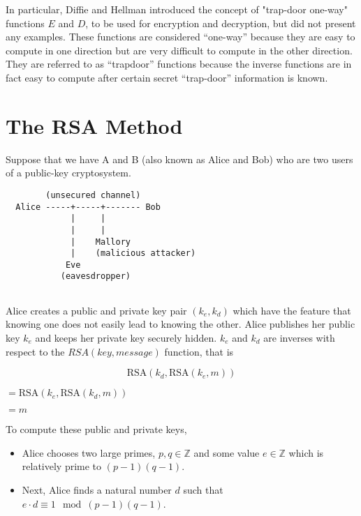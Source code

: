 \documentclass[12pt]{article}
\begin{document}
\begin{multicols}{2}
In particular, Diffie and Hellman introduced the concept of "trap-door one-way" functions $E$ and $D$, to be used for encryption and decryption,  but did not present any examples. These functions are considered “one-way” because they are easy to compute in one direction but are very difficult to compute in the other direction. They are referred to as “trapdoor” functions because the inverse functions are in fact easy to compute after certain secret “trap-door” information is known.
 
\maketitle
\section*{The RSA Method}

Suppose that we have A and B (also known as Alice and Bob) who are two users of a public-key cryptosystem.
\begin{verbatim}
        (unsecured channel)
  Alice -----+-----+------- Bob
             |     |
             |     |
             |    Mallory 
             |    (malicious attacker)
            Eve 
           (eavesdropper)
         
\end{verbatim}
Alice creates a public and private key pair $(k_e, k_d)$ which have the feature that knowing one does not easily lead to knowing the other. Alice publishes her public key $k_e$ and keeps her private key securely hidden. $k_e$ and $k_d$ are inverses with respect to the $RSA(key, message)$ function, that is 

$$\text{RSA}(k_d, \text{RSA}(k_e, m))$$
\begin{center}
$= \text{RSA}(k_e, \text{RSA}(k_d, m))$

$=m \qquad \qquad \qquad \quad \quad \ $ 
\end{center}

To compute these public and private keys, 

\renewcommand\labelitemi{\tiny$\bullet$}
\begin{itemize}

\item Alice chooses two large primes, $p,q \in \mathbb{Z}$ and some value $e \in \mathbb{Z}$ which is relatively prime to $(p-1)(q-1)$. 

\item Next, Alice finds a natural number $d$ such that $e\cdot d \equiv 1 \mod{(p-1)(q-1)}$.


\end{itemize}
\end{multicols}
\end{document}
